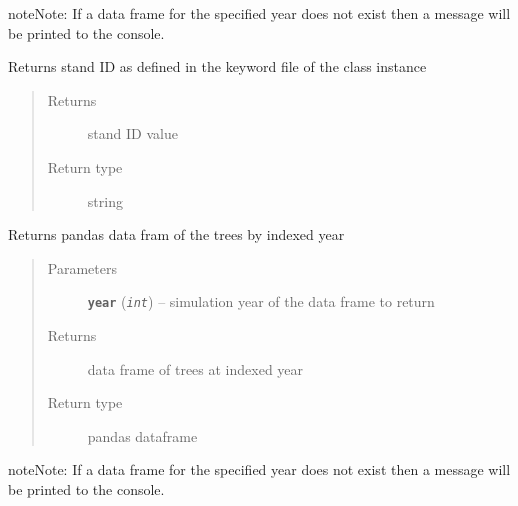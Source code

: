 \documentclass[letterpaper,10pt,english]{sphinxmanual}
\begin{document}
\begin{fulllineitems}
\begin{fulllineitems}
\begin{notice}{note}{Note:}
If a data frame for the specified year does not exist then
a message will be printed to the console.
\end{notice}

\end{fulllineitems}


\begin{fulllineitems}
\label{Fvsfuels:fuels.Fvsfuels.get_standid}
Returns stand ID as defined in the keyword file of the class instance
\begin{quote}\begin{description}
\item[{Returns}] \leavevmode
stand ID value

\item[{Return type}] \leavevmode
string

\end{description}\end{quote}

\end{fulllineitems}


\begin{fulllineitems}
\label{Fvsfuels:fuels.Fvsfuels.get_trees}
Returns pandas data fram of the trees by indexed year
\begin{quote}\begin{description}
\item[{Parameters}] \leavevmode
\textbf{\texttt{year}} (\emph{\texttt{int}}) -- simulation year of the data frame to return

\item[{Returns}] \leavevmode
data frame of trees at indexed year

\item[{Return type}] \leavevmode
pandas dataframe

\end{description}\end{quote}

\begin{notice}{note}{Note:}
If a data frame for the specified year does not exist then
a message will be printed to the console.
\end{notice}


\end{fulllineitems}
\end{fulllineitems}
\end{document}
